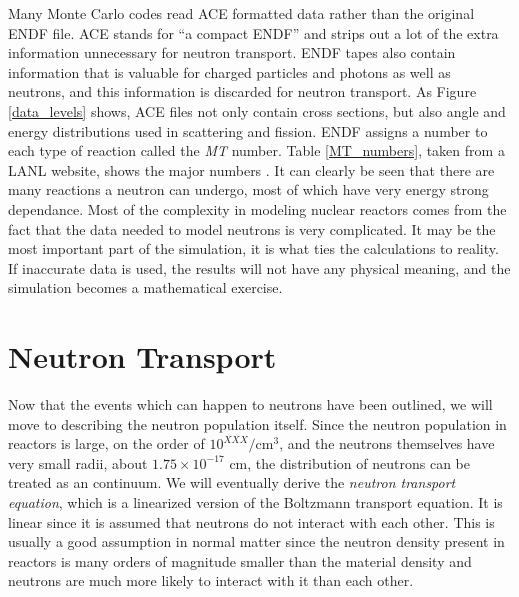 Many Monte Carlo codes read ACE formatted data rather than the original ENDF file.  ACE stands for ``a compact ENDF'' and strips out a lot of the extra information unnecessary for neutron transport.  ENDF tapes also contain information that is valuable for charged particles and photons as well as neutrons, and this information is discarded for neutron transport.  As Figure \ref{data_levels} shows, ACE files not only contain cross sections, but also angle and energy distributions used in scattering and fission.  ENDF assigns a number to each type of reaction called the \emph{MT} number.  Table \ref{MT_numbers}, taken from a LANL website, shows the major numbers \cite{MTnums}.  It can clearly be seen that there are many reactions a neutron can undergo, most of which have very energy strong dependance.  Most of the complexity in modeling nuclear reactors comes from the fact that the data needed to model neutrons is very complicated.  It may be the most important part of the simulation, it is what ties the calculations to reality.  If inaccurate data is used, the results will not have any physical meaning, and the simulation becomes a mathematical exercise. 

\section{Neutron Transport}

Now that the events which can happen to neutrons have been outlined, we will move to describing the neutron population itself.  Since the neutron population in reactors is large, on the order of $10^{XXX}/\mathrm{cm}^3$, and the neutrons themselves have very small radii, about $1.75\times10^{-17}$ cm, the distribution of neutrons can be treated as an continuum.  We will eventually derive the \emph{neutron transport equation}, which is a linearized version of the Boltzmann transport equation.  It is linear since it is assumed that neutrons do not interact with each other.  This is usually a good assumption in normal matter since the neutron density present in reactors is many orders of magnitude smaller than the material density and neutrons are much more likely to interact with it than each other.  

